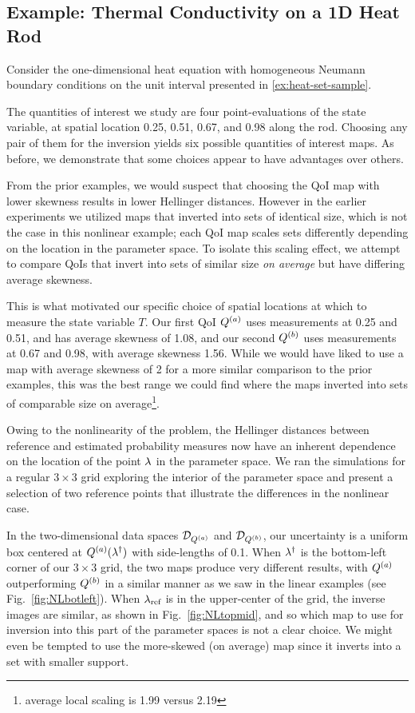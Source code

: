 \subsection{Example: Thermal Conductivity on a 1D Heat Rod}\label{ex:heat-set-sample-accuracy}

Consider the one-dimensional heat equation with homogeneous Neumann boundary conditions on the unit interval presented in \ref{ex:heat-set-sample}.


The quantities of interest we study are four point-evaluations of the state variable, at spatial location 0.25, 0.51, 0.67, and 0.98 along the rod.
Choosing any pair of them for the inversion yields six possible quantities of interest maps.
As before, we demonstrate that some choices appear to have advantages over others.

From the prior examples, we would suspect that choosing the QoI map with lower skewness results in lower Hellinger distances.
However in the earlier experiments we utilized maps that inverted into sets of identical size, which is not the case in this nonlinear example; each QoI map scales sets differently depending on the location in the parameter space.
To isolate this scaling effect, we attempt to compare QoIs that invert into sets of similar size \emph{on average} but have differing average skewness.

This is what motivated our specific choice of spatial locations at which to measure the state variable $T$.
Our first QoI $Q^{(a)}$ uses measurements at 0.25 and 0.51, and has average skewness of 1.08, and our second $Q^{(b)}$ uses measurements at 0.67 and 0.98, with average skewness 1.56.
While we would have liked to use a map with average skewness of 2 for a more similar comparison to the prior examples, this was the best range we could find where the maps inverted into sets of comparable size on average\footnote{average local scaling is 1.99 versus 2.19}.

Owing to the nonlinearity of the problem, the Hellinger distances between reference and estimated probability measures now have an inherent dependence on the location of the point $\lambda$ in the parameter space.
We ran the simulations for a regular $3\times3$ grid exploring the interior of the parameter space and present a selection of two reference points that illustrate the differences in the nonlinear case.

In the two-dimensional data spaces $\mathcal{D}_{Q^{(a)}}$ and $\mathcal{D}_{Q^{(b)}}$, our uncertainty is a uniform box centered at $Q^{(a)}(\lambda^\dagger)$ with side-lengths of 0.1.
When $\lambda^\dagger$ is the bottom-left corner of our $3\times3$ grid, the two maps produce very different results, with $Q^{(a)}$ outperforming $Q^{(b)}$ in a similar manner as we saw in the linear examples (see Fig.~\ref{fig:NLbotleft}).
When $\lambda_{\text{ref}}$ is in the upper-center of the grid, the inverse images are similar, as shown in Fig.~\ref{fig:NLtopmid}, and so which map to use for inversion into this part of the parameter spaces is not a clear choice. We might even be tempted to use the more-skewed (on average) map since it inverts into a set with smaller support.

